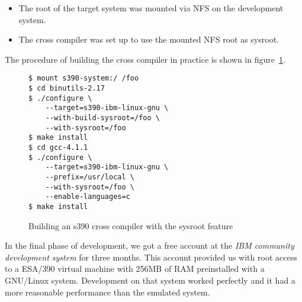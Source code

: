 \begin{itemize}
	\item The root of the target system was mounted via NFS on the development system.
	\item The cross compiler was set up to use the mounted NFS root as sysroot.
\end{itemize}

The procedure of building the cross compiler in practice is shown in figure~\ref{s390:fig:crosgcc}.

\begin{figure}
\begin{verbatim}
$ mount s390-system:/ /foo
$ cd binutils-2.17
$ ./configure \
    --target=s390-ibm-linux-gnu \
    --with-build-sysroot=/foo \
    --with-sysroot=/foo
$ make install
$ cd gcc-4.1.1
$ ./configure \
    --target=s390-ibm-linux-gnu \
    --prefix=/usr/local \
    --with-sysroot=/foo \
    --enable-languages=c
$ make install
\end{verbatim}
\caption{Building an s390 cross compiler with the sysroot feature}
\label{s390:fig:crosgcc}
\end{figure}

In the final phase of development, we got a free account at the \emph{IBM community development system} for three months. This account provided us with root access to a ESA/390 virtual machine with 256MB of RAM preinstalled with a GNU/Linux system. Development on that system worked perfectly and it had a more reasonable performance than the emulated system.





